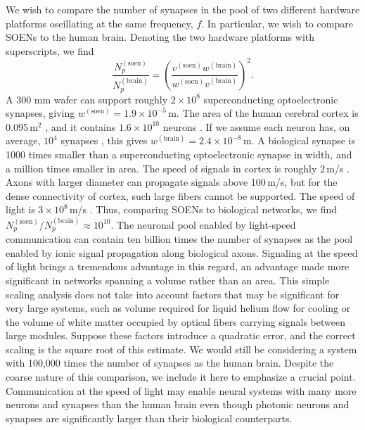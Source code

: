 \documentclass[aip,amsmath,amssymb,reprint,nofootinbib]{revtex4-1}
\begin{document}
We wish to compare the number of synapses in the pool of two different hardware platforms oscillating at the same frequency, $f$. In particular, we wish to compare SOENs to the human brain. Denoting the two hardware platforms with superscripts, we find
\begin{equation}
\label{eq:neuronalPool_number}
\frac{N_p^{(\mathrm{soen})}}{N_p^{(\mathrm{brain})}} = \left(\frac{v^{(\mathrm{soen})}w^{(\mathrm{brain})}}{w^{(\mathrm{soen})}v^{(\mathrm{brain})}}\right)^2.
\end{equation}
A 300 mm wafer can support roughly $2\times 10^8$ superconducting optoelectronic synapses, giving $w^{(\mathrm{soen})} = 1.9\times10^{-5}$\,m. The area of the human cerebral cortex is 0.095\,m$^2$ \cite{scva2014}, and it contains $1.6\times 10^{10}$ neurons \cite{azca2009,he2009}. If we assume each neuron has, on average, $10^4$ synapses \cite{brsc1998}, this gives $w^{(\mathrm{brain})} = 2.4\times 10^{-8}$\,m. A biological synapse is 1000 times smaller than a superconducting optoelectronic synapse in width, and a million times smaller in area. The speed of signals in cortex is roughly 2\,m/s \cite{edve2004}. Axons with larger diameter can propagate signals above 100\,m/s, but for the dense connectivity of cortex, such large fibers cannot be supported. The speed of light is $3\times 10^8$\,m/s \cite{speedOfLight}. Thus, comparing SOENs to biological networks, we find $N_p^{(\mathrm{soen})}/N_p^{(\mathrm{brain})} \approx 10^{10}$. The neuronal pool enabled by light-speed communication can contain ten billion times the number of synapses as the pool enabled by ionic signal propagation along biological axons. Signaling at the speed of light brings a tremendous advantage in this regard, an advantage made more significant in networks spanning a volume rather than an area. This simple scaling analysis does not take into account factors that may be significant for very large systems, such as volume required for liquid helium flow for cooling or the volume of white matter occupied by optical fibers carrying signals between large modules. Suppose these factors introduce a quadratic error, and the correct scaling is the square root of this estimate. We would still be considering a system with 100,000 times the number of synapses as the human brain. Despite the coarse nature of this comparison, we include it here to emphasize a crucial point. Communication at the speed of light may enable neural systems with many more neurons and synapses than the human brain even though photonic neurons and synapses are significantly larger than their biological counterparts.
\end{document}

